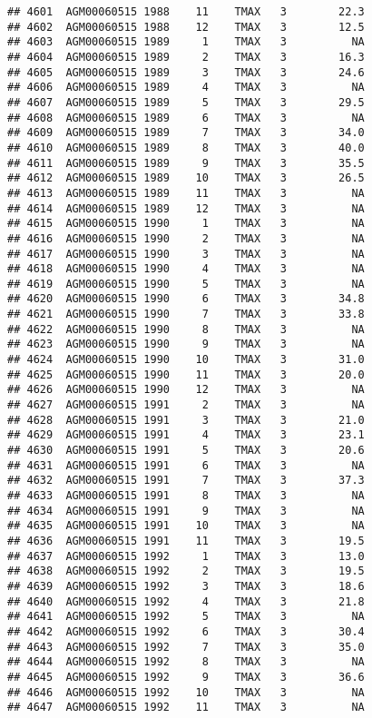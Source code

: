 \documentclass{article}\usepackage[]{graphicx}\usepackage[]{color}
\makeatletter
\newenvironment{kframe}{%
 \def\at@end@of@kframe{}%
 \ifinner\ifhmode%
  \def\at@end@of@kframe{\end{minipage}}%
  \begin{minipage}{\columnwidth}%
 \fi\fi%
 \def\FrameCommand##1{\hskip\@totalleftmargin \hskip-\fboxsep
 \colorbox{shadecolor}{##1}\hskip-\fboxsep
     \hskip-\linewidth \hskip-\@totalleftmargin \hskip\columnwidth}%
 \MakeFramed {\advance\hsize-\width
   \@totalleftmargin\z@ \linewidth\hsize
   \@setminipage}}%
 {\par\unskip\endMakeFramed%
 \at@end@of@kframe}
\newenvironment{knitrout}{}{} %
\makeatother
\begin{document}
\begin{knitrout}
\begin{kframe}
\begin{verbatim}
## 4601  AGM00060515 1988    11    TMAX   3        22.3
## 4602  AGM00060515 1988    12    TMAX   3        12.5
## 4603  AGM00060515 1989     1    TMAX   3          NA
## 4604  AGM00060515 1989     2    TMAX   3        16.3
## 4605  AGM00060515 1989     3    TMAX   3        24.6
## 4606  AGM00060515 1989     4    TMAX   3          NA
## 4607  AGM00060515 1989     5    TMAX   3        29.5
## 4608  AGM00060515 1989     6    TMAX   3          NA
## 4609  AGM00060515 1989     7    TMAX   3        34.0
## 4610  AGM00060515 1989     8    TMAX   3        40.0
## 4611  AGM00060515 1989     9    TMAX   3        35.5
## 4612  AGM00060515 1989    10    TMAX   3        26.5
## 4613  AGM00060515 1989    11    TMAX   3          NA
## 4614  AGM00060515 1989    12    TMAX   3          NA
## 4615  AGM00060515 1990     1    TMAX   3          NA
## 4616  AGM00060515 1990     2    TMAX   3          NA
## 4617  AGM00060515 1990     3    TMAX   3          NA
## 4618  AGM00060515 1990     4    TMAX   3          NA
## 4619  AGM00060515 1990     5    TMAX   3          NA
## 4620  AGM00060515 1990     6    TMAX   3        34.8
## 4621  AGM00060515 1990     7    TMAX   3        33.8
## 4622  AGM00060515 1990     8    TMAX   3          NA
## 4623  AGM00060515 1990     9    TMAX   3          NA
## 4624  AGM00060515 1990    10    TMAX   3        31.0
## 4625  AGM00060515 1990    11    TMAX   3        20.0
## 4626  AGM00060515 1990    12    TMAX   3          NA
## 4627  AGM00060515 1991     2    TMAX   3          NA
## 4628  AGM00060515 1991     3    TMAX   3        21.0
## 4629  AGM00060515 1991     4    TMAX   3        23.1
## 4630  AGM00060515 1991     5    TMAX   3        20.6
## 4631  AGM00060515 1991     6    TMAX   3          NA
## 4632  AGM00060515 1991     7    TMAX   3        37.3
## 4633  AGM00060515 1991     8    TMAX   3          NA
## 4634  AGM00060515 1991     9    TMAX   3          NA
## 4635  AGM00060515 1991    10    TMAX   3          NA
## 4636  AGM00060515 1991    11    TMAX   3        19.5
## 4637  AGM00060515 1992     1    TMAX   3        13.0
## 4638  AGM00060515 1992     2    TMAX   3        19.5
## 4639  AGM00060515 1992     3    TMAX   3        18.6
## 4640  AGM00060515 1992     4    TMAX   3        21.8
## 4641  AGM00060515 1992     5    TMAX   3          NA
## 4642  AGM00060515 1992     6    TMAX   3        30.4
## 4643  AGM00060515 1992     7    TMAX   3        35.0
## 4644  AGM00060515 1992     8    TMAX   3          NA
## 4645  AGM00060515 1992     9    TMAX   3        36.6
## 4646  AGM00060515 1992    10    TMAX   3          NA
## 4647  AGM00060515 1992    11    TMAX   3          NA

\end{verbatim}
\end{kframe}
\end{knitrout}
\end{document}
